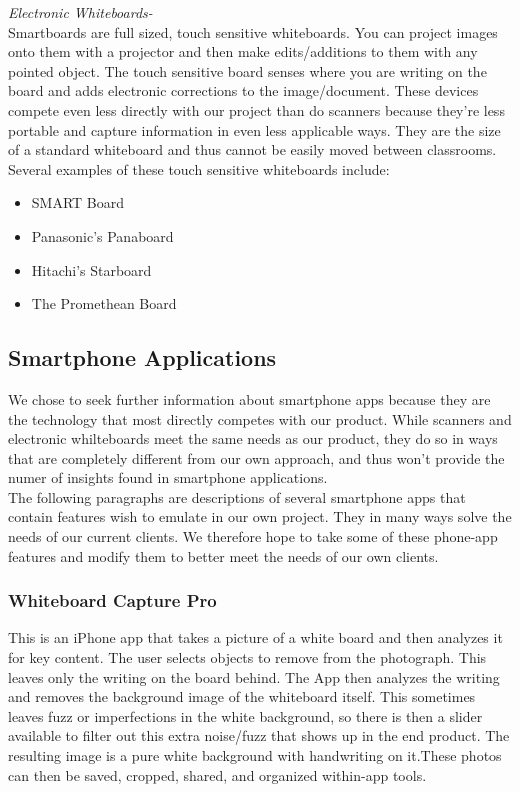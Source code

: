 \documentclass{article}
\begin{document}
		
		\noindent \emph{Electronic Whiteboards-} \\
Smartboards are full sized, touch sensitive whiteboards. You can project images onto them with a projector and then make edits/additions to them with any pointed object. The touch sensitive board senses where you are writing on the board and adds electronic corrections to the image/document. These devices compete even less directly with our project than do scanners because they're less portable and capture information in even less applicable ways. They are the size of a standard whiteboard and thus cannot be easily moved between classrooms. Several examples of these touch sensitive whiteboards include:
            \begin{itemize}
                \item SMART Board
                \item Panasonic's Panaboard
                \item Hitachi's Starboard
                \item The Promethean Board
            \end{itemize}
			
			\subsection*{Smartphone Applications}
We chose to seek further information about smartphone apps because they are the technology that most directly competes with our product. While scanners and electronic whilteboards meet the same needs as our product, they do so in ways that are completely different from our own approach, and thus won't provide the numer of insights found in smartphone applications. \\

The following paragraphs are descriptions of several smartphone apps that contain features wish to emulate in our own project. They in many ways solve the needs of our current clients. We therefore hope to take some of these phone-app features and modify them to better meet the needs of our own clients. \\
				\subsubsection*{Whiteboard Capture Pro}
					
This is an iPhone app that takes a picture of a white board and then analyzes it for key content. The user selects objects to remove from the photograph. This leaves only the writing on the board behind. The App then analyzes the writing and removes the background image of the whiteboard itself. This sometimes leaves fuzz or imperfections in the white background, so there is then a slider available to filter out this extra noise/fuzz that shows up in the end product. The resulting image is a pure white background with handwriting on it.These photos can then be saved, cropped, shared, and organized within-app tools. \cite{wcp} \\
\end{document}
